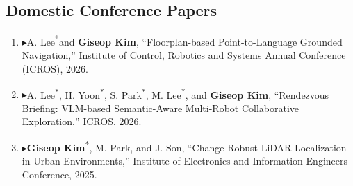 \documentclass[10pt,a4paper]{article}
\newcommand{\pub}[1]{\item #1}
\newcommand{\leadpub}{\textbf{\ensuremath{\blacktriangleright}}\hspace{0.25em}}
\newcommand{\me}{\textbf{Giseop Kim}}
\newcommand{\corr}{\textsuperscript{\dag}}
\newcommand{\first}{\textsuperscript{*}}
\begin{document}
\subsection{Domestic Conference Papers}
\begin{enumerate}[resume]
\pub{\leadpub A. Lee\first and \me\corr, ``Floorplan-based Point-to-Language Grounded Navigation,'' Institute of Control, Robotics and Systems Annual Conference (ICROS), 2026.}
\pub{\leadpub A. Lee\first, H. Yoon\first, S. Park\first, M. Lee\first, and \me\corr, ``Rendezvous Briefing: VLM-based Semantic-Aware Multi-Robot Collaborative Exploration,'' ICROS, 2026.}
\pub{\leadpub \me\first\corr, M. Park, and J. Son, ``Change-Robust LiDAR Localization in Urban Environments,'' Institute of Electronics and Information Engineers Conference, 2025.}
\end{enumerate}
\end{document}
